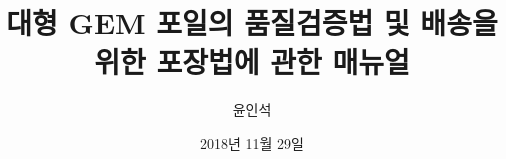 \documentclass[11pt]{article}
\title{대형 GEM 포일의 품질검증법 및 배송을 위한 포장법에 관한 매뉴얼}
\author{윤인석}
\date{2018년 11월 29일}
\begin{document}
\maketitle

\begin{abstract}
  
\end{abstract}

\clearpage

\tableofcontents
\listoffigures
\listoftables

\clearpage







\appendix
  
\end{document}
